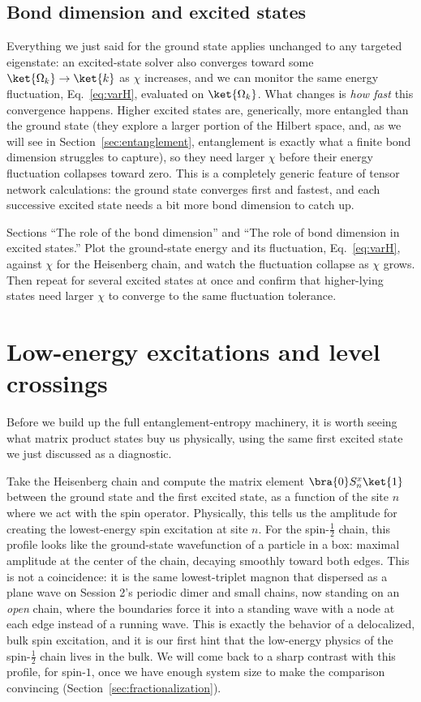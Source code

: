 \documentclass[all_sessions.tex]{subfiles}
\begin{document}
\subsection{Bond dimension and excited states}
Everything we just said for the ground state applies unchanged to any targeted eigenstate: an
excited-state solver also converges toward some $\ket{\Omega_k}\to\ket{k}$ as $\chi$ increases, and
we can monitor the same energy fluctuation, Eq.~\eqref{eq:varH}, evaluated on $\ket{\Omega_k}$. What
changes is \emph{how fast} this convergence happens. Higher excited states are, generically, more
entangled than the ground state (they explore a larger portion of the Hilbert space, and, as we
will see in Section~\ref{sec:entanglement}, entanglement is exactly what a finite bond dimension
struggles to capture), so they need larger $\chi$ before their energy fluctuation collapses toward
zero. This is a completely generic feature of tensor network calculations: the ground state
converges first and fastest, and each successive excited state needs a bit more bond dimension to
catch up.

\begin{notebook}
Sections ``The role of the bond dimension'' and ``The role of bond dimension in excited states.''
Plot the ground-state energy and its fluctuation, Eq.~\eqref{eq:varH}, against $\chi$ for the
Heisenberg chain, and watch the fluctuation collapse as $\chi$ grows. Then repeat for several
excited states at once and confirm that higher-lying states need larger $\chi$ to converge to the
same fluctuation tolerance.
\end{notebook}

\section{Low-energy excitations and level crossings}
Before we build up the full entanglement-entropy machinery, it is worth seeing what matrix product
states buy us physically, using the same first excited state we just discussed as a diagnostic.

Take the Heisenberg chain and compute the matrix element $\bra{0}S_n^x\ket{1}$ between the ground
state and the first excited state, as a function of the site $n$ where we act with the spin
operator. Physically, this tells us the amplitude for creating the lowest-energy spin excitation
at site $n$. For the spin-$\tfrac12$ chain, this profile looks like the ground-state wavefunction
of a particle in a box: maximal amplitude at the center of the chain, decaying smoothly toward
both edges. This is not a coincidence: it is the same lowest-triplet magnon that dispersed as a
plane wave on Session 2's periodic dimer and small chains, now standing on an \emph{open} chain,
where the boundaries force it into a standing wave with a node at each edge instead of a running
wave. This is exactly the behavior of a delocalized, bulk spin excitation, and it is our
first hint that the low-energy physics of the spin-$\tfrac12$ chain lives in the bulk. We will
come back to a sharp contrast with this profile, for spin-$1$, once we have enough system size to
make the comparison convincing (Section~\ref{sec:fractionalization}).
\end{document}
